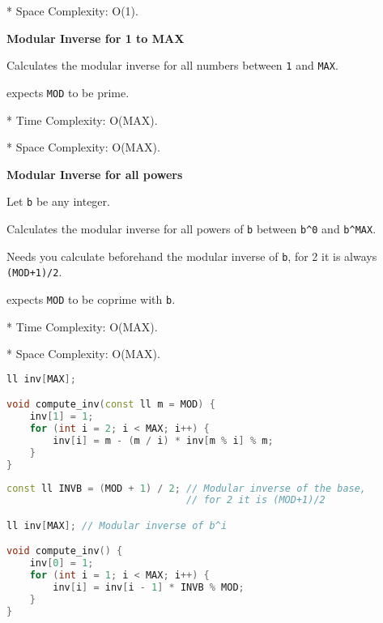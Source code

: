 \documentclass[11pt, a4paper, oneside]{book}
\begin{document}
* Space Complexity: O(1).



\textbf{Modular Inverse for 1 to MAX} 



Calculates the modular inverse for all numbers between \lstinline{1} and \lstinline{MAX}.



expects \lstinline{MOD} to be prime.



* Time Complexity: O(MAX).

* Space Complexity: O(MAX).



\textbf{Modular Inverse for all powers} 



Let \lstinline{b} be any integer.



Calculates the modular inverse for all powers of \lstinline{b} between \lstinline{b^0} and \lstinline{b^MAX}.



Needs you calculate beforehand the modular inverse of \lstinline{b}, for 2 it is always \lstinline{(MOD+1)/2}.



expects \lstinline{MOD} to be coprime with \lstinline{b}.



* Time Complexity: O(MAX).

* Space Complexity: O(MAX).

\hfill

\begin{multicols}{2}
\begin{lstlisting}[language=C++]
ll inv[MAX];

void compute_inv(const ll m = MOD) {
    inv[1] = 1;
    for (int i = 2; i < MAX; i++) {
        inv[i] = m - (m / i) * inv[m % i] % m;
    }
}
\end{lstlisting}
\end{multicols}

\hfill

\begin{multicols}{2}
\begin{lstlisting}[language=C++]
const ll INVB = (MOD + 1) / 2; // Modular inverse of the base,
                               // for 2 it is (MOD+1)/2

ll inv[MAX]; // Modular inverse of b^i

void compute_inv() {
    inv[0] = 1;
    for (int i = 1; i < MAX; i++) {
        inv[i] = inv[i - 1] * INVB % MOD;
    }
}
\end{lstlisting}
\end{multicols}
\end{document}
